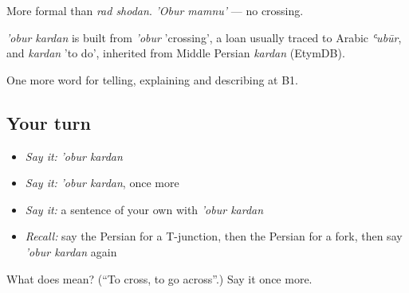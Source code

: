 More formal than \emph{rad shodan}. \emph{'Obur mamnu'} — no crossing.

\begin{cousinweb}
\emph{'obur kardan} is built from \emph{'obur} 'crossing', a loan usually traced to Arabic \emph{ʿubūr}, and \emph{kardan} 'to do', inherited from Middle Persian \emph{kardan} (EtymDB).
\end{cousinweb}

\begin{grammarlens}[title={What you've built}]
One more word for telling, explaining and describing at B1.
\end{grammarlens}

\subsection*{Your turn}
\begin{itemize}
\raggedright
  \item \emph{Say it:} \emph{'obur kardan}
  \item \emph{Say it:} \emph{'obur kardan}, once more
  \item \emph{Say it:} a sentence of your own with \emph{'obur kardan}
  \item \emph{Recall:} say the Persian for a T-junction, then the Persian for a fork, then say \emph{'obur kardan} again
\end{itemize}

\begin{tcolorbox}[breakable,colback=teal!4,colframe=teal!35!black,title={Before you move on}]
What does   mean? (\textquotedblleft{}To cross, to go across\textquotedblright{}.) Say it once more.
\end{tcolorbox}
